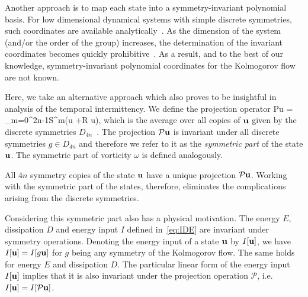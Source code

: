 \documentclass{jfm}
\begin{document}
Another approach is to map each state into a symmetry-invariant polynomial
basis.
For low dimensional dynamical systems with simple discrete
symmetries, such coordinates are available
analytically~\citep{GL-Gil07b}. As the dimension of the system (and/or the order of the
group) increases, the
determination of the invariant coordinates becomes quickly prohibitive~\citep{SiCvi10}.
As a result, and to the best of our knowledge,
symmetry-invariant polynomial
coordinates for the Kolmogorov flow are not known.

Here, we take an alternative approach which also proves to be insightful in analysis
of the temporal intermittency. We define the projection operator
\beq
\mathcal P\mathbf u = \sum_{m=0}^{2n-1}\mathcal S^m\left(\mathbf u +\mathcal R\mathbf
u\right),
\label{DnA1proj}
\eeq
which is the average over all copies of $\mathbf u$ given by the discrete symmetries
$D_{4n}$~\citep{DasBuch}.
The projection $\mathcal P\mathbf u$ is invariant under all discrete symmetries $g\in D_{4n}$
and therefore we refer to it as the \emph{symmetric part} of the state $\mathbf u$. The symmetric
part of vorticity $\omega$ is defined analogously.

All $4n$ symmetry copies of the state $\mathbf u$ have a unique projection $\mathcal P\mathbf
u$. Working with the symmetric part of the states, therefore, eliminates the complications
arising from the discrete symmetries.

Considering this symmetric part also has a physical
motivation. The energy $E$, dissipation $D$ and energy input $I$ defined in~\eqref{eq:IDE}
are invariant under symmetry operations. Denoting the energy input of a state $\mathbf u$
by $I[\mathbf u]$, we have $I[\mathbf u]=I[g\mathbf u]$ for $g$ being any symmetry of the Kolmogorov flow.
The same holds for energy $E$ and dissipation $D$. The particular linear form of the energy input $I[\mathbf u]$
implies that it is also invariant under the projection operation
$\mathcal P$, i.e. $I[\mathbf u]=I[\mathcal P\mathbf u]$.
\end{document}
